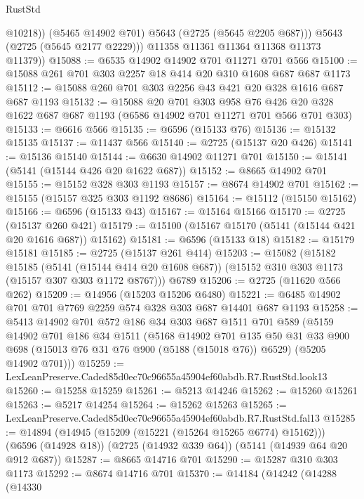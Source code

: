 \begin{lexlean}{RustStd}
\begin{coremodule}
                @10218))
            (@5465 @14902 @701)
            @5643
            (@2725 (@5645 @2205 @687)))
          @5643
          (@2725 (@5645 @2177 @2229)))
        @11358
        @11361
        @11364
        @11368
        @11373
        @11379))
@15088 := @6535 @14902 @14902 @701 @11271 @701 @566
@15100 := @15088 @261 @701 @303 @2257 @18 @414 @20 @310 @1608 @687 @687 @1173
@15112 := @15088 @260 @701 @303 @2256 @43 @421 @20 @328 @1616 @687 @687 @1193
@15132 := @15088
    @20
    @701
    @303
    @958
    @76
    @426
    @20
    @328
    @1622
    @687
    @687
    @1193
    (@6586 @14902 @701 @11271 @701 @566 @701 @303)
@15133 := @6616 @566
@15135 := @6596 (@15133 @76)
@15136 := @15132 @15135
@15137 := @11437 @566
@15140 := @2725 (@15137 @20 @426)
@15141 := @15136 @15140
@15144 := @6630 @14902 @11271 @701
@15150 := @15141 (@5141 (@15144 @426 @20 @1622 @687))
@15152 := @8665 @14902 @701
@15155 := @15152 @328 @303 @1193
@15157 := @8674 @14902 @701
@15162 := @15155 (@15157 @325 @303 @1192 @8686)
@15164 := @15112 (@15150 @15162)
@15166 := @6596 (@15133 @43)
@15167 := @15164 @15166
@15170 := @2725 (@15137 @260 @421)
@15179 := @15100 (@15167 @15170 (@5141 (@15144 @421 @20 @1616 @687)) @15162)
@15181 := @6596 (@15133 @18)
@15182 := @15179 @15181
@15185 := @2725 (@15137 @261 @414)
@15203 := @15082
    (@15182
      @15185
      (@5141 (@15144 @414 @20 @1608 @687))
      (@15152 @310 @303 @1173 (@15157 @307 @303 @1172 @8767)))
    @6789
@15206 := @2725 (@11620 @566 @262)
@15209 := @14956 (@15203 @15206 @6480)
@15221 := @6485 @14902 @701 @701 @7769 @2259 @574 @328 @303 @687 @14401 @687 @1193
@15258 := @5413
    @14902
    @701
    @572
    @186
    @34
    @303
    @687
    @1511
    @701
    @589
    (@5159
      @14902
      @701
      @186
      @34
      @1511
      (@5168
        @14902
        @701
        @135
        @50
        @31
        @33
        @900
        @698
        (@15013 @76 @31 @76 @900 (@5188 (@15018 @76)) @6529)
        (@5205 @14902 @701)))
@15259 := LexLeanPreserve.Caded85d0ec70c96655a45904ef60abdb.R7.RustStd.look13
@15260 := @15258 @15259
@15261 := @5213 @14246
@15262 := @15260 @15261
@15263 := @5217 @14254
@15264 := @15262 @15263
@15265 := LexLeanPreserve.Caded85d0ec70c96655a45904ef60abdb.R7.RustStd.fal13
@15285 := @14894
    (@14945 (@15209 (@15221 (@15264 @15265 @6774) @15162)))
    (@6596 (@14928 @18))
    (@2725 (@14932 @339 @64))
    (@5141 (@14939 @64 @20 @912 @687))
@15287 := @8665 @14716 @701
@15290 := @15287 @310 @303 @1173
@15292 := @8674 @14716 @701
@15370 := @14184
    (@14242
      (@14288
        (@14330

\end{coremodule}
\end{lexlean}
